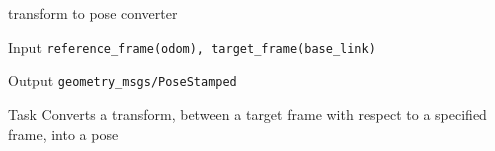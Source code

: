 \begin{frame}{transform to pose converter}
	\begin{alertblock}{Input}
	\texttt{reference\_frame(odom), target\_frame(base\_link)}
    \end{alertblock}
    
    \begin{alertblock}{Output}
	\texttt{geometry\_msgs/PoseStamped}
    \end{alertblock}
    
    \begin{alertblock}{Task}
    Converts a transform, between a target frame with respect to a specified frame, into a pose
    \end{alertblock}
\end{frame}


